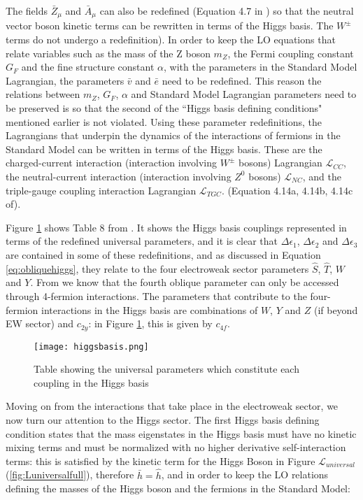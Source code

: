 \documentclass[11pt,oneside,a4paper]{article}
\begin{document}
The fields $\bar{Z}_{\mu}$ and $\bar{A}_{\mu}$ can also be redefined (Equation 4.7 in \cite{universal}) so that the neutral vector boson kinetic terms can be rewritten in terms of the Higgs basis. The $W^{\pm}$ terms do not undergo a redefinition). In order to keep the LO equations that relate variables such as the mass of the Z boson $m_{Z}$, the Fermi coupling constant $G_{F}$ and the fine structure constant $\alpha$, with the parameters in the Standard Model Lagrangian, the parameters $\bar{v}$ and $\bar{e}$ need to be redefined. This reason the relations between $m_{Z}$, $G_{F}$, $\alpha$ and Standard Model Lagrangian parameters need to be preserved is so that the second of the ``Higgs basis defining conditions" mentioned earlier is not violated. Using these parameter redefinitions, the Lagrangians that underpin the dynamics of the interactions of fermions in the Standard Model can be written in terms of the Higgs basis. These are the charged-current interaction (interaction involving $W^{\pm}$ bosons) Lagrangian $\mathcal{L}_{CC}$, the neutral-current interaction (interaction involving $Z^{0}$ bosons) $\mathcal{L}_{NC}$, and the triple-gauge coupling interaction Lagrangian $\mathcal{L}_{TGC}$. (Equation 4.14a, 4.14b, 4.14c of\cite{universal}).

Figure \ref{fig:higgsbasis} shows Table 8 from \cite{universal}. It shows the Higgs basis couplings represented in terms of the redefined universal parameters, and it is clear that $\Delta\epsilon_{1}$, $\Delta\epsilon_{2}$ and $\Delta\epsilon_{3}$ are contained in some of these redefinitions, and as discussed in Equation \ref{eq:obliquehiggs}, they relate to the four electroweak sector parameters $\hat{S}$, $\hat{T}$, $W$ and $Y$. From \cite{dimmensions} we know that the fourth oblique parameter can only be accessed through 4-fermion interactions. The parameters that contribute to the four-fermion interactions in the Higgs basis are combinations of $W$, $Y$ and $Z$ (if beyond EW sector) and $c_{2y}$: in Figure \ref{fig:higgsbasis}, this is given by $c_{4f}$. 

\begin{figure}[H]
	\texttt{[image: higgsbasis.png]}
	\caption{Table showing the universal parameters which constitute each coupling in the Higgs basis \cite{universal}}
	\label{fig:higgsbasis}
\end{figure}





Moving on from the interactions that take place in the electroweak sector, we now turn our attention to the Higgs sector. The first Higgs basis defining condition states that the mass eigenstates in the Higgs basis must have no kinetic mixing terms and must be normalized with no higher derivative self-interaction terms: this is satisfied by the kinetic term for the Higgs Boson in Figure $\mathcal{L}_{universal}$ (\ref{fig:Luniversalfull}), therefore $\bar{h} = \hat{h}$, and in order to keep the LO relations defining the masses of the Higgs boson and the fermions in the Standard Model:
\end{document}

